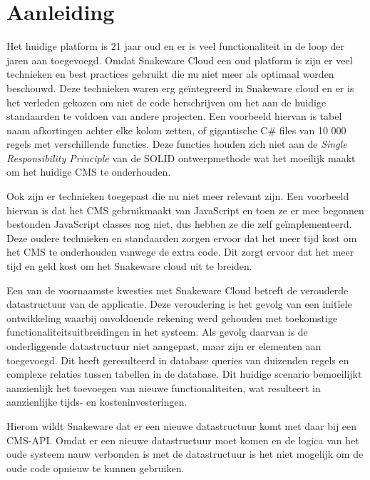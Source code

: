 \section{Aanleiding}
Het huidige platform is 21 jaar oud en er is veel functionaliteit in de loop der jaren aan toegevoegd.
Omdat Snakeware Cloud een oud platform is zijn er veel technieken en best practices gebruikt die nu niet meer als optimaal worden beschouwd.
Deze technieken waren erg geïntegreerd in Snakeware cloud en er is het verleden gekozen om niet de code herschrijven om het aan de huidige standaarden te voldoen van andere projecten.
Een voorbeeld hiervan is tabel naam afkortingen achter elke kolom zetten, of gigantische C\# \Parencite{CSharp} files van 10 000 regels met verschillende functies.
Deze functies houden zich niet aan de \textit{Single Responsibility Principle} van de SOLID ontwerpmethode \Parencite{SOLID} wat het moeilijk maakt om het huidige \gls{CMS} te onderhouden.

\whitespace
Ook zijn er technieken toegepast die nu niet meer relevant zijn.
Een voorbeeld hiervan is dat het \gls{CMS} gebruikmaakt van JavaScript \Parencite{JavaScript} en toen ze er mee begonnen bestonden JavaScript classes \Parencite{JavascriptClasses} nog niet, dus hebben ze die zelf geïmplementeerd.
Deze oudere technieken en standaarden zorgen ervoor dat het meer tijd kost om het CMS te onderhouden vanwege de extra code.
Dit zorgt ervoor dat het meer tijd en geld kost om het Snakeware cloud uit te breiden.

\whitespace[2]
Een van de voornaamste kwesties met Snakeware Cloud betreft de verouderde datastructuur van de applicatie.
Deze veroudering is het gevolg van een initïele ontwikkeling waarbij onvoldoende rekening werd gehouden met toekomstige functionaliteitsuitbreidingen in het systeem.
Als gevolg daarvan is de onderliggende datastructuur niet aangepast, maar zijn er elementen aan toegevoegd.
Dit heeft geresulteerd in database queries van duizenden regels en complexe relaties tussen tabellen in de database.
Dit huidige scenario bemoeilijkt aanzienlijk het toevoegen van nieuwe functionaliteiten, wat resulteert in aanzienlijke tijds- en kosteninvesteringen.

\whitespace[2]
Hierom wildt Snakeware dat er een nieuwe datastructuur komt met daar bij een \gls{CMS}-API.
Omdat er een nieuwe datastructuur moet komen en de logica van het oude systeem nauw verbonden is met de datastructuur is het niet mogelijk om de oude code opnieuw te kunnen
gebruiken.
